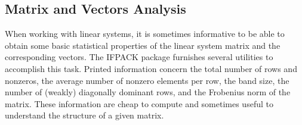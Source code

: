 \documentclass[10pt,relax]{SANDreport}
\begin{document}
\subsection{Matrix and Vectors Analysis}
\label{sec:analyze}

When working with linear systems, it is sometimes informative to be able to
obtain some basic statistical properties of the linear system matrix and
the corresponding vectors. 
The IFPACK package furnishes several utilities to accomplish this task.
Printed information concern the total number of rows and nonzeros, the average
number of nonzero elements per row, the band size, the number of (weakly)
  diagonally dominant rows, and the Frobenius norm of the matrix. These
  information are cheap to compute and sometimes useful to understand the
  structure of a given matrix.
\end{document}
